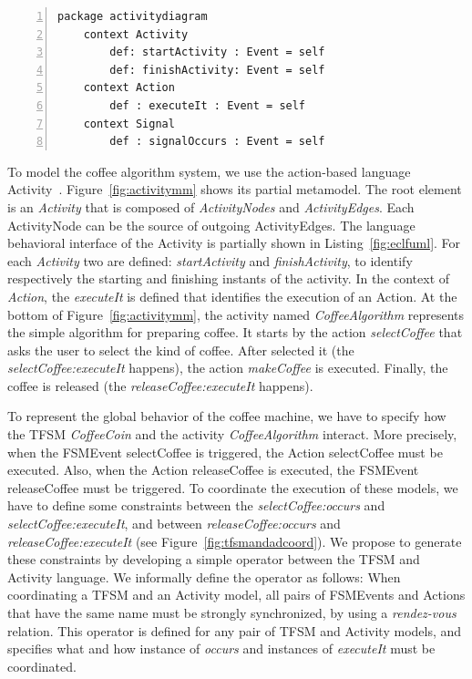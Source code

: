 	\begin{lstlisting}[language=ecl,
	caption={Partial \ecl specification of Activity Diagram},
	label={fig:eclfuml}, 
	basicstyle=\scriptsize\ttfamily, backgroundcolor=\color{LGrey}, numbers=left, xleftmargin=3pt, belowskip=-0.4em]
	package activitydiagram
	context Activity
		def: startActivity : Event = self
		def: finishActivity: Event = self
	context Action
		def : executeIt : Event = self
	context Signal
		def : signalOccurs : Event = self
	\end{lstlisting}
To model the coffee algorithm system, we use the action-based language Activity~\cite{ttc15bib}. Figure~\ref{fig:activitymm} shows its partial metamodel. The root element is an \emph{Activity} that is composed of \emph{ActivityNodes} and \emph{ActivityEdges}. Each ActivityNode can be the source of outgoing ActivityEdges. The language behavioral interface of the Activity is partially shown in Listing~\ref{fig:eclfuml}. For each \emph{Activity} two \dse are defined: \emph{startActivity} and \emph{finishActivity}, to identify respectively the starting and finishing instants of the activity. In the context of \emph{Action}, the \dse \emph{executeIt} is defined that identifies the execution of an Action. At the bottom of Figure~\ref{fig:activitymm}, the activity named \emph{CoffeeAlgorithm} represents the simple algorithm for preparing coffee. It starts by the action \emph{selectCoffee} that asks the user to select the kind of coffee. After selected it (the \mse \emph{selectCoffee:executeIt} happens), the action \emph{makeCoffee} is executed. Finally, the coffee is released (the \mse \emph{releaseCoffee:executeIt} happens).

To represent the global behavior of the coffee machine, we have to specify how the TFSM \emph{CoffeeCoin} and the activity \emph{CoffeeAlgorithm} interact. More precisely, when the FSMEvent selectCoffee is triggered, the Action selectCoffee must be executed. Also, when the Action releaseCoffee is executed, the FSMEvent releaseCoffee must be triggered. To coordinate the execution of these models, we have to define some constraints between the \mse \emph{selectCoffee:occurs} and \emph{selectCoffee:executeIt}, and between \emph{releaseCoffee:occurs} and \emph{releaseCoffee:executeIt} (see Figure~\ref{fig:tfsmandadcoord}). We propose to generate these constraints by developing a simple \bcool operator between the TFSM and Activity language. We informally define the operator as follows: When coordinating a TFSM and an Activity model, all pairs of FSMEvents and Actions that have the same name must be strongly synchronized, \ie by using a \emph{rendez-vous} relation. This operator is defined for any pair of TFSM and Activity models, and specifies what and how instance of \dse \emph{occurs} and instances of \dse \emph{executeIt} must be coordinated. 

